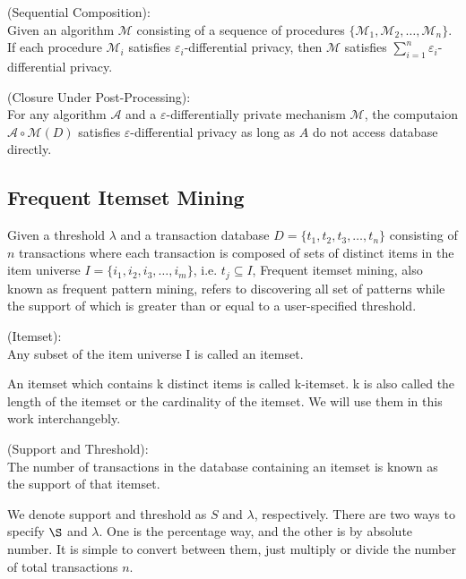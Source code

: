 \documentclass[conference]{IEEEtran}
\begin{document}
\begin{lemma}{(Sequential Composition):}\\\label{lm1}
Given an algorithm $\mathcal{M}$ consisting of a sequence of procedures $\{\mathcal{M}_1,\mathcal{M}_2,\dots,\mathcal{M}_n\}$. 
If each procedure $\mathcal{M}_i$ satisfies $\varepsilon_i$-differential privacy, then $\mathcal{M}$ satisfies $\sum_{i=1}^n\varepsilon_i$-differential privacy.
\end{lemma}

\begin{lemma}{(Closure Under Post-Processing):}\\\label{lm2}
    For any algorithm $\mathcal{A}$ and a $\varepsilon$-differentially private mechanism $\mathcal{M}$,
    the computaion $\mathcal{A}\circ\mathcal{M}(D)$ satisfies $\varepsilon$-differential privacy as long as $A$ do not access database directly.
    
\end{lemma}


\subsection{Frequent Itemset Mining}
Given a threshold  $\lambda$ and a transaction database $D=\{t_1,t_2,t_3,\dots,t_n\}$ consisting of $n$ transactions where each transaction is composed of sets of distinct items in the item universe $I=\{i_1,i_2,i_3,\dots,i_m\}$, i.e. $t_j\subseteq I$,
Frequent itemset mining, also known as frequent pattern mining, refers to discovering all set of patterns while the support of which is greater than or equal to a user-specified threshold.

\begin{definition}{(Itemset):}\\
Any subset of the item universe I is called an itemset.
\end{definition}
An itemset which contains k distinct items is called k-itemset. k is also called the length of the itemset or the cardinality of the itemset. 
We will use them in this work interchangebly.


\begin{definition}{(Support and Threshold):}\\
The number of transactions in the database containing an itemset is known as the support of that itemset.
\end{definition}
We denote support and threshold as $S$ and $\lambda$, respectively.
There are two ways to specify $\S$ and $\lambda$. One is the percentage way, and the other is by absolute number.
It is simple to convert between them, just multiply or divide the number of total transactions $n$.
\end{document}
